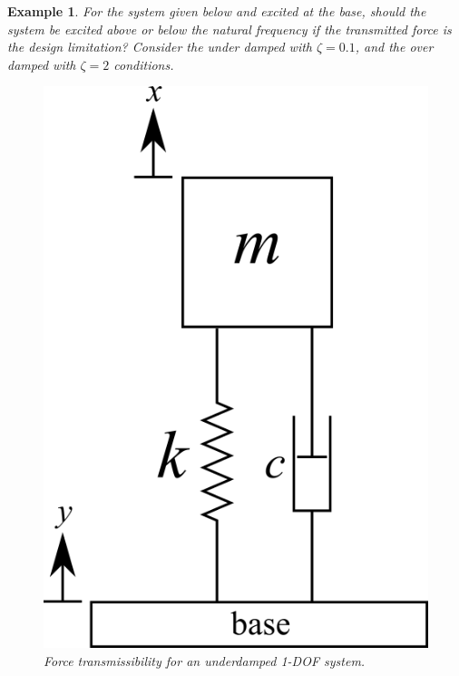 \documentclass[12pt,letter]{article}
\newtheorem{ex}{Example}
\numberwithin{ex}{section} %
\newenvironment{example}{\begin{mdframed}[middlelinewidth=0.5mm]\begin{ex}\normalfont}{\end{ex}\end{mdframed}}
\numberwithin{re}{section} %
\begin{document}
				\begin{example}
					
					For the system given below and excited at the base, should the system be excited above or below the natural frequency if the transmitted force is the design limitation? Consider the under damped with $\zeta=0.1$, and the over damped with $\zeta=2$ conditions. 
		
					\begin{figure}[H]
						\centering
						\includegraphics[]{../Figures/1_DOF_spring_dashpot_mass_vertical_base_excited.png}
						\caption{Force transmissibility for an underdamped 1-DOF system.}
					\end{figure}		
				

\end{example}
\end{document}
